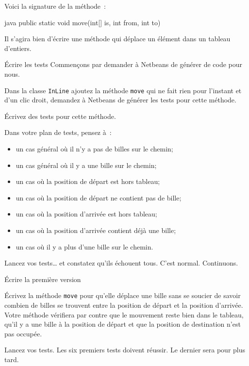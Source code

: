 \documentclass[a4paper,11pt]{style-esi/td}
\begin{document}
Voici la signature de la méthode~:

\begin{Code}{java}
	public static void move(int[] is, int from, int to)
\end{Code}

Il s'agira bien d'écrire une méthode qui déplace un élément dans un tableau
d'entiers. 

\pagebreak
\begin{Exercice}{Écrire les tests}
	Commençons par demander à Netbeans de générer de code pour nous. 

	\begin{steps}		
		\item Dans la classe \texttt{InLine} ajoutez la méthode \texttt{move}
			qui ne fait rien pour l'instant et d'un clic droit, demandez
			à Netbeans de générer les tests pour cette méthode. 

		\item Écrivez des tests pour cette méthode.
	\end{steps}

Dans votre plan de tests, pensez à~:

\begin{itemize}
	\item un cas général où il n'y a pas de billes sur le chemin;
	\item un cas général où il y a une bille sur le chemin;
	\item un cas où la position de départ est hors tableau;
	\item un cas où la position de départ ne contient pas de bille;
	\item un cas où la position d'arrivée est hors tableau;
	\item un cas où la position d'arrivée contient déjà une bille;
	\item un cas où il y a plus d'une bille sur le chemin.
\end{itemize}

\end{Exercice}

Lancez vos tests… et constatez qu'ils échouent tous. C'est normal. Continuons. 

\begin{Exercice}{Écrire la première version}
	\begin{steps}
		\item Écrivez la méthode \texttt{move} pour qu'elle déplace une bille
			sans se soucier de savoir combien de billes se trouvent entre la
			position de départ et la position d'arrivée. Votre méthode
			vérifiera par contre que le mouvement reste bien dans le tableau,
			qu'il y a une bille à la position de départ et que la position 
			de destination n'est pas occupée. 

		\item Lancez vos tests. Les six premiers tests doivent réussir. Le
			dernier sera pour plus tard.
	
\end{steps}
\end{Exercice}
\end{document}
